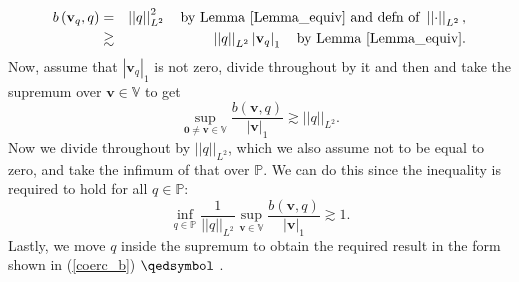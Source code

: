 \documentclass[12pt,a4paper]{article}
\theoremstyle{definition}
\begin{document}
\begin{eqnarray}
b\left(\textbf{v}_q,q\right) &=& \left|\left|q\right|\right|_{L^2}^2 \quad\text{by Lemma \ref{Lemma_equiv}  and defn of } \nonumber \left|\left|\cdot\right|\right|_{L^2},\\
&\gtrsim& \left|\left|q\right|\right|_{L^2} \left|\textbf{v}_q\right|_1\quad \text{by Lemma \ref{Lemma_equiv}}.\nonumber
\end{eqnarray}
Now, assume that $\left|\textbf{v}_q\right|_1$ is not zero, divide throughout by it and then and take the supremum over $\textbf{v}\in \mathbb{V}$ to get
\begin{equation}
\sup_{\textbf{0}\neq\textbf{v}\in \mathbb{V}}\frac{b\left(\textbf{v},q\right)}{\left|\textbf{v}\right|_1} \gtrsim \left|\left|q\right|\right|_{L^2}.\nonumber
\end{equation}
Now we divide throughout by $\left|\left|q\right|\right|_{L^2}$, which we also assume not to be equal to zero, and take the infimum of that over $\mathbb{P}$.  We can do this since the inequality is required to hold for all $q\in \mathbb{P}$:
\begin{equation}
\inf_{q\in \mathbb{P}}\frac{1}{\left|\left|q\right|\right|_{L^2}}\sup_{\textbf{v}\in \mathbb{V}}\frac{b\left(\textbf{v},q\right)}{\left|\textbf{v}\right|_1} \gtrsim 1 \nonumber.
\end{equation}
Lastly, we move $q$  inside the supremum to obtain the required result in the form shown in (\ref{coerc_b}) $\qedsymbol$ .  
\end{document}
